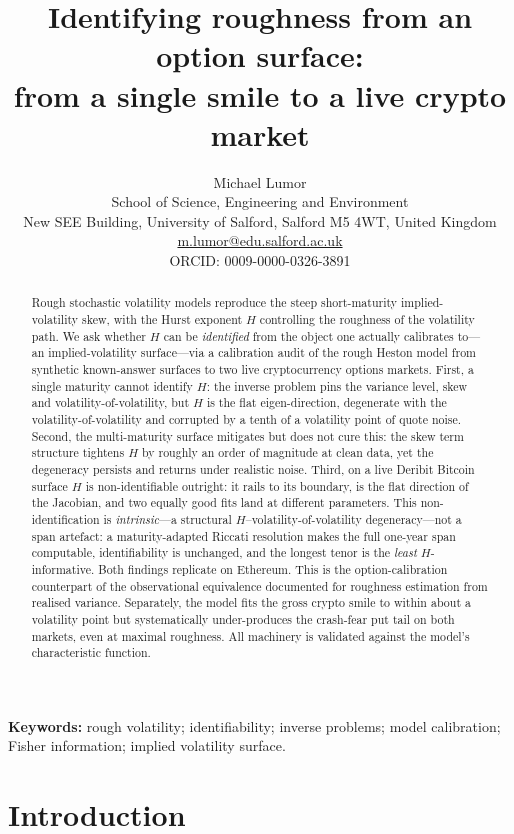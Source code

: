 \documentclass[11pt,a4paper]{article}
\title{Identifying roughness from an option surface:\\ from a single smile to a live crypto market}
\author{Michael Lumor\\[3pt]
\small School of Science, Engineering and Environment\\
\small New SEE Building, University of Salford, Salford M5 4WT, United Kingdom\\
\small \href{mailto:m.lumor@edu.salford.ac.uk}{m.lumor@edu.salford.ac.uk}\\
\small ORCID: 0009-0000-0326-3891}
\date{}
\numberwithin{equation}{section}
\begin{document}
\maketitle

\begin{abstract}
Rough stochastic volatility models reproduce the steep short-maturity implied-volatility
skew, with the Hurst exponent $H$ controlling the roughness of the volatility path. We ask
whether $H$ can be \emph{identified} from the object one actually calibrates to---an
implied-volatility surface---via a calibration audit of the rough Heston model from
synthetic known-answer surfaces to two live cryptocurrency options markets. First, a
single maturity cannot identify $H$: the inverse problem pins the variance level, skew and
volatility-of-volatility, but $H$ is the flat eigen-direction, degenerate with the
volatility-of-volatility and corrupted by a tenth of a volatility point of quote noise.
Second, the multi-maturity surface mitigates but does not cure this: the skew term
structure tightens $H$ by roughly an order of magnitude at clean data, yet the degeneracy
persists and returns under realistic noise. Third, on a live Deribit Bitcoin surface $H$
is non-identifiable outright: it rails to its boundary, is the flat direction of the
Jacobian, and two equally good fits land at different parameters. This non-identification
is \emph{intrinsic}---a structural $H$--volatility-of-volatility degeneracy---not a span
artefact: a maturity-adapted Riccati resolution makes the full one-year span computable,
identifiability is unchanged, and the longest tenor is the \emph{least} $H$-informative.
Both findings replicate on Ethereum. This is the option-calibration counterpart of the
observational equivalence documented for roughness estimation from realised variance.
Separately, the model fits the gross crypto smile to within about a volatility point but
systematically under-produces the crash-fear put tail on both markets, even at maximal
roughness. All machinery is validated against the model's characteristic function.
\end{abstract}

\noindent\textbf{Keywords:} rough volatility; identifiability; inverse problems; model calibration; Fisher information; implied volatility surface.

\medskip


\section{Introduction}\label{sec:intro}
\end{document}

